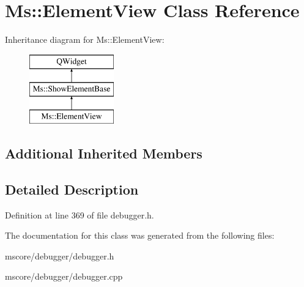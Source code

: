 \hypertarget{class_ms_1_1_element_view}{}\section{Ms\+:\+:Element\+View Class Reference}
\label{class_ms_1_1_element_view}
Inheritance diagram for Ms\+:\+:Element\+View\+:\begin{figure}[H]
\begin{center}
\leavevmode
\includegraphics[height=3.000000cm]{class_ms_1_1_element_view}
\end{center}
\end{figure}
\subsection*{Additional Inherited Members}


\subsection{Detailed Description}


Definition at line 369 of file debugger.\+h.



The documentation for this class was generated from the following files\+:\begin{DoxyCompactItemize}
\item 
mscore/debugger/debugger.\+h\item 
mscore/debugger/debugger.\+cpp\end{DoxyCompactItemize}
